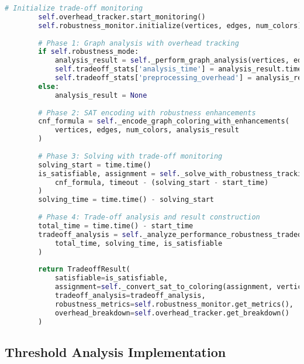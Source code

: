 \begin{lstlisting}[language=Python, caption=Enhanced Solver Architecture for Performance-Robustness Trade-offs]
        # Initialize trade-off monitoring
        self.overhead_tracker.start_monitoring()
        self.robustness_monitor.initialize(vertices, edges, num_colors)
        
        # Phase 1: Graph analysis with overhead tracking
        if self.robustness_mode:
            analysis_result = self._perform_graph_analysis(vertices, edges)
            self.tradeoff_stats['analysis_time'] = analysis_result.time_cost
            self.tradeoff_stats['preprocessing_overhead'] = analysis_result.overhead_factor
        else:
            analysis_result = None
        
        # Phase 2: SAT encoding with robustness enhancements
        cnf_formula = self._encode_graph_coloring_with_enhancements(
            vertices, edges, num_colors, analysis_result
        )
        
        # Phase 3: Solving with trade-off monitoring
        solving_start = time.time()
        is_satisfiable, assignment = self._solve_with_robustness_tracking(
            cnf_formula, timeout - (solving_start - start_time)
        )
        solving_time = time.time() - solving_start
        
        # Phase 4: Trade-off analysis and result construction
        total_time = time.time() - start_time
        tradeoff_analysis = self._analyze_performance_robustness_tradeoff(
            total_time, solving_time, is_satisfiable
        )
        
        return TradeoffResult(
            satisfiable=is_satisfiable,
            assignment=self._convert_sat_to_coloring(assignment, vertices, num_colors),
            tradeoff_analysis=tradeoff_analysis,
            robustness_metrics=self.robustness_monitor.get_metrics(),
            overhead_breakdown=self.overhead_tracker.get_breakdown()
        )
\end{lstlisting}

\subsection{Threshold Analysis Implementation}
\label{appendix:threshold-analysis}

